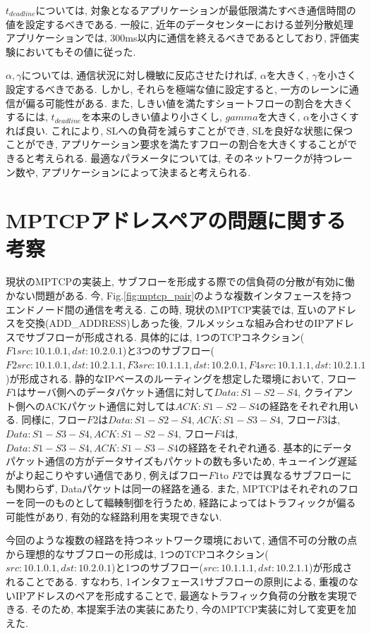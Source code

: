 $t_{deadline}$については, 対象となるアプリケーションが最低限満たすべき通信時間の値を設定するべきである. 
一般に, 近年のデータセンターにおける並列分散処理アプリケーションでは, 300ms以内に通信を終えるべきであるとしており, 評価実験においてもその値に従った. 

$\alpha, \gamma$については, 通信状況に対し機敏に反応させたければ, $\alpha$を大きく, $\gamma$を小さく設定するべきである. 
しかし, それらを極端な値に設定すると, 一方のレーンに通信が偏る可能性がある. 
また, しきい値を満たすショートフローの割合を大きくするには, $t_{deadline}$を本来のしきい値より小さくし, $gamma$を大きく,
$\alpha$を小さくすれば良い. 
これにより, SLへの負荷を減らすことができ, SLを良好な状態に保つことができ,
アプリケーション要求を満たすフローの割合を大きくすることができると考えられる. 
最適なパラメータについては, そのネットワークが持つレーン数や, アプリケーションによって決まると考えられる. 


\section{MPTCPアドレスペアの問題に関する考察}
現状のMPTCPの実装上, サブフローを形成する際での信負荷の分散が有効に働かない問題がある. 
今, Fig.\ref{fig:mptcp_pair}のような複数インタフェースを持つエンドノード間の通信を考える. 
この時, 現状のMPTCP実装では, 互いのアドレスを交換(ADD\_ADDRESS)しあった後,
フルメッシュな組み合わせのIPアドレスでサブフローが形成される. 
具体的には, 1つのTCPコネクション($F1{src:10.1.0.1, dst:10.2.0.1}$)と3つのサブフロー($F2{src:10.1.0.1,
dst:10.2.1.1}, F3{src:10.1.1.1, dst:10.2.0.1}, F4{src:10.1.1.1,
dst:10.2.1.1}$)が形成される. 
静的なIPベースのルーティングを想定した環境において, フロー$F1$はサーバ側へのデータパケット通信に対して$Data:S1-S2-S4$,
クライアント側へのACKパケット通信に対しては$ACK:S1-S2-S4$の経路をそれぞれ用いる. 
同様に, フロー$F2$は$Data:S1-S2-S4, ACK:S1-S3-S4$, フロー$F3$は, $Data:S1-S3-S4,
ACK:S1-S2-S4$, フロー$F4$は, $Data:S1-S3-S4, ACK:S1-S3-S4$の経路をそれぞれ通る. 
基本的にデータパケット通信の方がデータサイズもパケットの数も多いため, キューイング遅延がより起こりやすい通信であり, 例えばフロー$F1$to
$F2$では異なるサブフローにも関わらず, Dataパケットは同一の経路を通る. 
また, MPTCPはそれぞれのフローを同一のものとして輻輳制御を行うため, 経路によってはトラフィックが偏る可能性があり, 有効的な経路利用を実現できない. 

今回のような複数の経路を持つネットワーク環境において, 通信不可の分散の点から理想的なサブフローの形成は,
1つのTCPコネクション(${src:10.1.0.1, dst:10.2.0.1}$)と1つのサブフロー(${src:10.1.1.1,
dst:10.2.1.1}$)が形成されることである. 
すなわち, 1インタフェース1サブフローの原則による, 重複のないIPアドレスのペアを形成することで, 最適なトラフィック負荷の分散を実現できる. 
そのため, 本提案手法の実装にあたり, 今のMPTCP実装に対して変更を加えた. 


